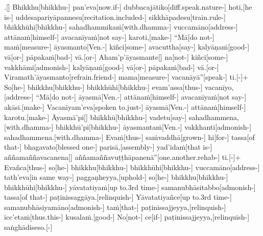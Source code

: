 \documentclass[12pt]{article}
\begin{document}
\begin{paracol}{2}
\begin{column}
\begin{flushleft}
.[] Bhikkhu[bhikkhu-] pan’eva[now.if-] dubbacajātiko[diff.speak.nature-] hoti,[he is-] uddesapariyāpannesu[recitation.included-] sikkhāpadesu[train.rule-] bhikkhūhi[bhikkhu-] sahadhammikaṁ[with.dhamma-] vuccamāno[address-] attānaṁ[himself-] avacanīyaṁ[not say-] karoti,[make-] “Mā[do not-] maṁ[measure-] āyasmanto[Ven.-] kiñci[some-] avacuttha[say-] kalyāṇaṁ[good-] vā[or-] pāpakaṁ[bad-] vā.[or-] Aham’p’āyasmante[] na[not-] kiñci[some-] vakkhāmi[admonish-] kalyāṇaṁ[good-] vā[or-] pāpakaṁ[bad-] vā.[or-] Viramath’āyasmanto[refrain.friend-] mama[measure-] vacanāyā”[speak-] ti.[-\NUL{\GMU{}}]+ So[he-] bhikkhu[bhikkhu-] bhikkhūhi[bhikkhu-] evam’assa[thus-] vacanīyo,[address-] “Mā[do not-] āyasmā[Ven.-] attānaṁ[himself-] avacanīyaṁ[not say-] akāsi.[make-] Vacanīyam’eva[spoken to.just-] āyasmā[Ven.-] attānaṁ[himself-] karotu.[make-] Āyasmā’pi[] bhikkhū[bhikkhu-] vadetu[say-] sahadhammena,[with.dhamma-] bhikkhū’pi[bhikkhu-] āyasmantaṁ[Ven.-] vakkhanti[admonish-] sahadhammena.[with.dhamma-] Evaṁ[thus-] saṁvaddhā[grown-] hi[for-] tassa[of that-] bhagavato[blessed one-] parisā,[assembly-] yad’idaṁ[that is-] aññamaññavacanena[] aññamaññavuṭṭhāpanenā”[one.another.rehab-] ti.[-\NUL{\GMU{}}]+ Evañca[thus-] so[he-] bhikkhu[bhikkhu-] bhikkhūhi[bhikkhu-] vuccamāno[address-] tath’eva[in same way-\NUL{\GMU{}}] paggaṇheyya,[uphold-] so[he-] bhikkhu[bhikkhu-] bhikkhūhi[bhikkhu-] yāvatatiyaṁ[up to.3rd time-] samanubhāsitabbo[admonish-] tassa[of that-] paṭinissaggāya.[relinquish-] Yāvatatiyañce[up to.3rd time-] samanubhāsiyamāno[admonish-] taṁ[that-] paṭinissajjeyya,[relinquish-] icc’etaṁ[thus.this-] kusalaṁ.[good-] No[not-] ce[if-\NUL{\GMU{}}] paṭinissajjeyya,[relinquish-] saṅghādiseso.[-\NUL{\GMU{}}]

\end{flushleft}
\end{column}
\end{paracol}
\end{document}

